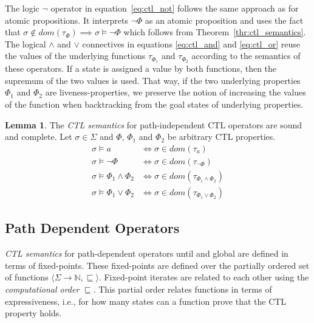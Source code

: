 \documentclass[11pt,a4paper,titlepage]{article}
\theoremstyle{definition}
\newtheorem{lemma}[theorem]{Lemma}
\begin{document}
The logic $\neg$ operator in equation~\ref{eq:ctl_not} follows the same approach as for atomic propositions. 
It interprets $\neg \Phi$ as an atomic proposition and uses the fact that
$\sigma \notin dom(\tau_{\Phi}) \implies \sigma \models \neg \Phi$ which follows from Theorem~\ref{thr:ctl_semantics}.\\

The logical $\land$ and $\lor$ connectives in equations \ref{eq:ctl_and} and \ref{eq:ctl_or} reuse the values of the underlying functions $\tau_{\Phi_1}$ and
$\tau_{\Phi_2}$ according to the semantics of these operators. If a state is assigned a value by both functions, 
then the supremum of the two values is used. That way, if the two underlying properties $\Phi_1$ and $\Phi_2$ are liveness-properties,
we preserve the notion of increasing the values of the function when backtracking from the goal states of underlying properties.

\begin{lemma}\label{lem:ctl_semantics_path_independent}
    The \textit{CTL semantics} for path-independent CTL operators are sound and complete. 
    Let $\sigma \in \Sigma$ and $\Phi$, $\Phi_1$ and $\Phi_2$ be arbitrary CTL properties.
    \begin{align}
        \sigma \models a &\iff \sigma \in dom(\tau_{a})\\
        \sigma \models \neg \Phi &\iff \sigma \in dom(\tau_{\neg \Phi})\\
        \sigma \models \Phi_1 \land \Phi_2 &\iff \sigma \in dom(\tau_{\Phi_1 \land \Phi_2})\\
        \sigma \models \Phi_1 \lor \Phi_2 &\iff \sigma \in dom(\tau_{\Phi_1 \lor \Phi_2})
    \end{align}
\end{lemma}


\subsection{Path Dependent Operators}

\textit{CTL semantics} for path-dependent operators \textsf{until} and \textsf{global} are defined in terms of fixed-points. 
These fixed-points are defined over the partially ordered set of functions $\langle \Sigma \rightarrow \mathbb{N}, \sqsubseteq \rangle$. 
Fixed-point iterates are related to each other using the \textit{computational order} $\sqsubseteq$. 
This partial order relates functions in terms of expressiveness, i.e., for how many states can a function prove that the CTL property holds.
\end{document}
